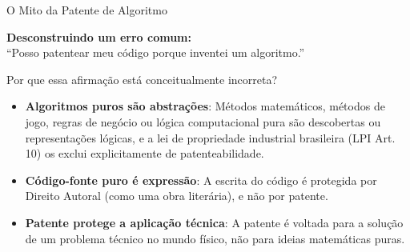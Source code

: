 \documentclass[9pt]{beamer}
\begin{document}
\begin{frame}{O Mito da Patente de Algoritmo}
  \begin{center}
    \large\color{mRed}\textbf{Desconstruindo um erro comum:}\\
    \large\color{structure.fg}``Posso patentear meu código porque inventei um algoritmo.''
  \end{center}
  
  \vspace{0.2cm}
  
  \begin{block}{Por que essa afirmação está conceitualmente incorreta?}
    \small
    \begin{itemize}
      \item \textbf{Algoritmos puros são abstrações}: Métodos matemáticos, métodos de jogo, regras de negócio ou lógica computacional pura são descobertas ou representações lógicas, e a lei de propriedade industrial brasileira (LPI Art. 10) os exclui explicitamente de patenteabilidade.
      \item \textbf{Código-fonte puro é expressão}: A escrita do código é protegida por Direito Autoral (como uma obra literária), e não por patente.
      \item \textbf{Patente protege a aplicação técnica}: A patente é voltada para a solução de um problema técnico no mundo físico, não para ideias matemáticas puras.
    \end{itemize}
  \end{block}
\end{frame}
\end{document}
